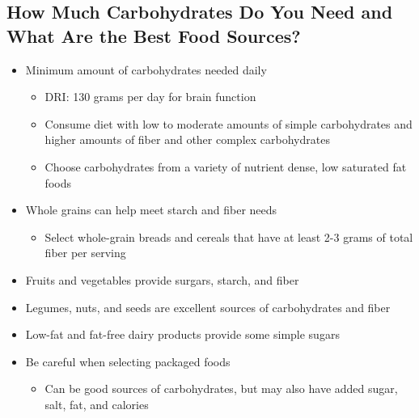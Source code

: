 \documentclass[12pt]{article}
\begin{document}
        \subsection{How Much Carbohydrates Do You Need and What Are the Best Food Sources?}
            \begin{itemize}
                \item Minimum amount of carbohydrates needed daily
                    \begin{itemize}
                        \item DRI: 130 grams per day for brain function
                        \item Consume diet with low to moderate amounts of simple carbohydrates and higher amounts of fiber and other complex carbohydrates
                        \item Choose carbohydrates from a variety of nutrient dense, low saturated fat foods
                    \end{itemize}
                \item Whole grains can help meet starch and fiber needs
                    \begin{itemize}
                        \item Select whole-grain breads and cereals that have at least 2-3 grams of total fiber per serving
                    \end{itemize}
                \item Fruits and vegetables provide surgars, starch, and fiber
                \item Legumes, nuts, and seeds are excellent sources of carbohydrates and fiber
                \item Low-fat and fat-free dairy products provide some simple sugars
                \item Be careful when selecting packaged foods
                    \begin{itemize}
                        \item Can be good sources of carbohydrates, but may also have added sugar, salt, fat, and calories
                    \end{itemize}
            \end{itemize}
\end{document}
